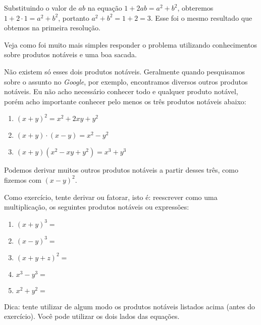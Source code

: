 \documentclass[a4paper, 12pt]{article}
\begin{document}
\noindent Substituindo o valor de \(ab\) na equação   \(1 + 2ab = a^2 + b^2\), obteremos   \(1 + 2\cdot{1} = a^2 + b^2\), portanto \(a^2 + b^2 = 1 + 2 = 3\). Esse foi o mesmo resultado que obtemos na primeira resolução. 

\noindent Veja como foi muito mais simples responder o problema utilizando conhecimentos sobre produtos notáveis e uma boa sacada. 


\noindent Não existem só esses dois produtos notáveis. Geralmente quando pesquisamos sobre o assunto no \textit{Google}, por exemplo, encontramos diversos outros produtos notáveis. Eu não acho necessário conhecer todo e qualquer produto notável, porém acho importante conhecer pelo menos os três produtos notáveis abaixo:

\begin{enumerate}
    \item   \((x+y)^2 = x^2 + 2xy + y^2\)
    \item   \((x+y)\cdot{(x-y)} = x^2 - y^2\)
    \item   \((x+y)(x^2 - xy + y^2) = x^3 + y^3\) 
\end{enumerate}  


\noindent Podemos derivar muitos outros produtos notáveis a partir desses três, como fizemos com \((x -y)^2\).  

\noindent Como exercício, tente derivar ou fatorar, isto é: reescrever como uma multiplicação, os seguintes produtos notáveis ou expressões:

\begin{enumerate}
    \item   \((x+y)^3 =\)
    \item   \((x-y)^3 =\)
    \item   \((x + y + z)^2 =\)
    \item   \(x^3 - y^3 =\)
    \item   \(x^2 + y^2 =\)
    
\end{enumerate}


\noindent Dica: tente utilizar de algum modo os produtos notáveis listados acima (antes do exer\-cí\-cio). Você pode utilizar os dois lados das equações.  %
\end{document}
